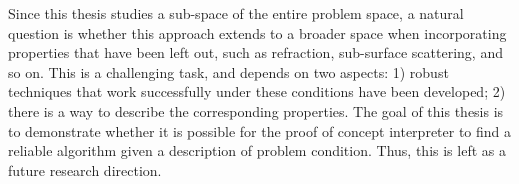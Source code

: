 Since this thesis studies a sub-space of the entire problem space, a natural question is whether this approach extends to a broader space when incorporating properties that have been left out, such as refraction, sub-surface scattering, and so on. This is a challenging task, and depends on two aspects: 1) robust techniques that work successfully under these conditions have been developed; 2) there is a way to describe the corresponding properties. The goal of this thesis is to demonstrate whether it is possible for the proof of concept interpreter to find a reliable algorithm given a description of problem condition. Thus, this is left as a future research direction.
